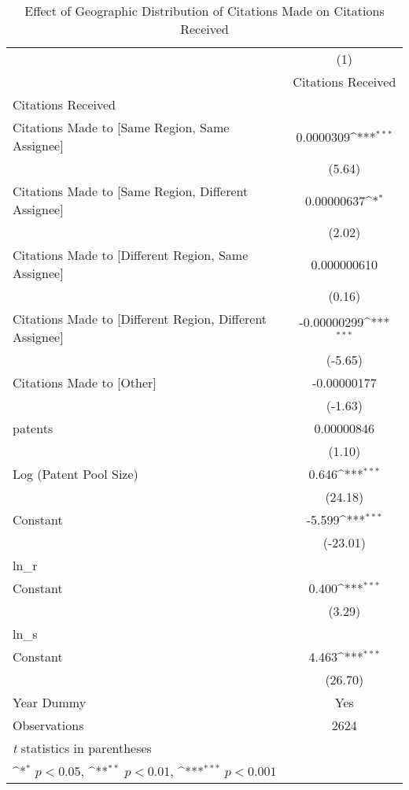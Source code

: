 {
\def\sym#1{\ifmmode^{#1}\else\(^{#1}\)\fi}
\begin{longtable}{l*{1}{c}}
\caption{Effect of Geographic Distribution of Citations Made on Citations Received \label{eflowsreg}}\\
\hline\hline\endfirsthead\hline\endhead\hline\endfoot\endlastfoot
                    &\multicolumn{1}{c}{(1)}\\
                    &\multicolumn{1}{c}{Citations Received}\\
\hline
Citations Received  &                     \\
Citations Made to [Same Region, Same Assignee]&   0.0000309\sym{***}\\
                    &      (5.64)         \\
[1em]
Citations Made to [Same Region, Different Assignee]&  0.00000637\sym{*}  \\
                    &      (2.02)         \\
[1em]
Citations Made to [Different Region, Same Assignee]& 0.000000610         \\
                    &      (0.16)         \\
[1em]
Citations Made to [Different Region, Different Assignee]& -0.00000299\sym{***}\\
                    &     (-5.65)         \\
[1em]
Citations Made to [Other]& -0.00000177         \\
                    &     (-1.63)         \\
[1em]
patents             &  0.00000846         \\
                    &      (1.10)         \\
[1em]
Log (Patent Pool Size)&       0.646\sym{***}\\
                    &     (24.18)         \\
[1em]
Constant            &      -5.599\sym{***}\\
                    &    (-23.01)         \\
\hline
ln\_r                &                     \\
Constant            &       0.400\sym{***}\\
                    &      (3.29)         \\
\hline
ln\_s                &                     \\
Constant            &       4.463\sym{***}\\
                    &     (26.70)         \\
[1em]
Year Dummy          &         Yes         \\
\hline
Observations        &        2624         \\
\hline\hline
\multicolumn{2}{l}{\footnotesize \textit{t} statistics in parentheses}\\
\multicolumn{2}{l}{\footnotesize \sym{*} \(p<0.05\), \sym{**} \(p<0.01\), \sym{***} \(p<0.001\)}\\
\end{longtable}
}
